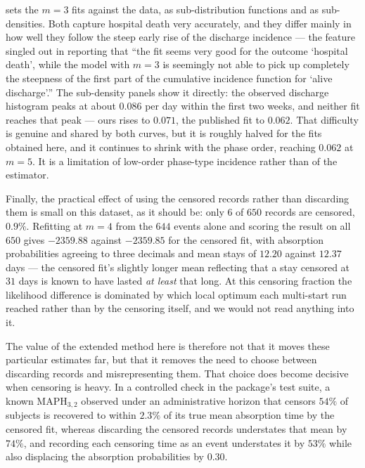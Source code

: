 \documentclass{article}
\newenvironment{rcrevision}{}{}
\newcommand{\aachg}[1]{#1}
\newcommand{\subchg}[1]{#1}
\begin{document}
\begin{rcrevision}
\aachg{ sets the $m=3$ fits against the data, as sub-distribution functions and as sub-densities.} Both capture hospital death very accurately, and they differ mainly in how well they follow the steep early rise of the discharge incidence --- the feature \citet{lindqvist_phase-type_2022} singled out in reporting that ``the fit seems very good for the outcome `hospital death', while the model with $m=3$ is seemingly not able to pick up completely the steepness of the first part of the cumulative incidence function for `alive discharge'.'' \aachg{The sub-density panels show it directly: the observed discharge histogram peaks at about $0.086$ per day within the first two weeks, and neither fit reaches that peak --- ours rises to $0.071$, the published fit to $0.062$.} That difficulty is genuine and shared by both curves, but it is roughly halved for the fits obtained here, and it continues to shrink with the phase order, reaching $0.062$ at $m=5$. It is a limitation of low-order phase-type incidence rather than of the estimator.

Finally, the practical effect of using the censored records rather than discarding them is small on this dataset, as it should be: only $6$ of $650$ records are censored, $0.9\%$. \subchg{Refitting at $m=4$ from the $644$ events alone and scoring the result on all $650$ gives $-2359.88$ against $-2359.85$ for the censored fit, with absorption probabilities agreeing to three decimals and mean stays of $12.20$ against $12.37$ days} --- the censored fit's slightly longer mean reflecting that a stay censored at $31$ days is known to have lasted {\em at least} that long. At this censoring fraction the likelihood difference is dominated by which local optimum each multi-start run reached rather than by the censoring itself, and we would not read anything into it.

The value of the extended method here is therefore not that it moves these particular estimates far, but that it removes the need to choose between discarding records and misrepresenting them. That choice does become decisive when censoring is heavy. In a controlled check in the package's test suite, a known $\text{MAPH}_{3,2}$ observed under an administrative horizon that censors $54\%$ of subjects is recovered to within $2.3\%$ of its true mean absorption time by the censored fit, whereas discarding the censored records understates that mean by $74\%$, and recording each censoring time as an event understates it by $53\%$ while also displacing the absorption probabilities by $0.30$.
\end{rcrevision}
\end{document}
